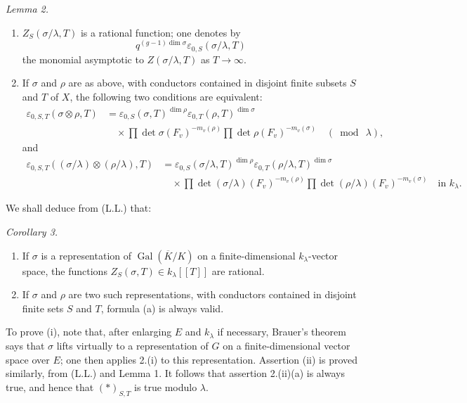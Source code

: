 \documentclass[11pt]{article}
\newcommand{\Gal}{\operatorname{Gal}}
\newcommand{\eps}{\varepsilon}
\begin{document}
\emph{Lemma 2.}
\begin{enumerate}[label=(\roman*)]
\item \(Z_S(\sigma/\lambda,T)\) is a rational function; one denotes by
\[
q^{(g-1)\dim\sigma}\eps_{0,S}(\sigma/\lambda,T)
\]
the monomial asymptotic to \(Z(\sigma/\lambda,T)\) as \(T\to\infty\).
\item If \(\sigma\) and \(\rho\) are as above, with conductors contained in disjoint finite subsets \(S\) and \(T\) of \(X\), the following two conditions are equivalent:
\[
\tag{a}
\begin{aligned}
\eps_{0,S,T}(\sigma\otimes\rho,T)
&=\eps_{0,S}(\sigma,T)^{\dim\rho}
  \eps_{0,T}(\rho,T)^{\dim\sigma}  \\
&\quad\times
\prod \det\sigma(F_v)^{-m_v(\rho)}
\prod \det\rho(F_v)^{-m_v(\sigma)}
\quad(\bmod\ \lambda),
\end{aligned}
\]
and
\[
\tag{b}
\begin{aligned}
\eps_{0,S,T}((\sigma/\lambda)\otimes(\rho/\lambda),T)
&=\eps_{0,S}(\sigma/\lambda,T)^{\dim\rho}
  \eps_{0,T}(\rho/\lambda,T)^{\dim\sigma}  \\
&\quad\times
\prod \det(\sigma/\lambda)(F_v)^{-m_v(\rho)}
\prod \det(\rho/\lambda)(F_v)^{-m_v(\sigma)}
\quad\text{in }k_\lambda .
\end{aligned}
\]
\end{enumerate}

We shall deduce from (L.L.) that:

\emph{Corollary 3.}
\begin{enumerate}[label=(\roman*)]
\item If \(\sigma\) is a representation of \(\Gal(\overline K/K)\) on a finite-dimensional \(k_\lambda\)-vector space, the functions \(Z_S(\sigma,T)\in k_\lambda[[T]]\) are rational.
\item If \(\sigma\) and \(\rho\) are two such representations, with conductors contained in disjoint finite sets \(S\) and \(T\), formula (a) is always valid.
\end{enumerate}

To prove (i), note that, after enlarging \(E\) and \(k_\lambda\) if necessary, Brauer's theorem says that \(\sigma\) lifts virtually to a representation of \(G\) on a finite-dimensional vector space over \(E\); one then applies 2.(i) to this representation. Assertion (ii) is proved similarly, from (L.L.) and Lemma 1. It follows that assertion 2.(ii)(a) is always true, and hence that \((*)_{S,T}\) is true modulo \(\lambda\).
\end{document}
